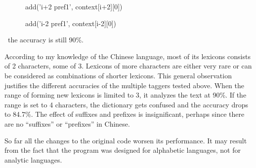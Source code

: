 \documentclass[letterpaper]{article}
\begin{document}
\ \ \ \ \ \ add('i+2 pref1', context[i+2][0])

\ \ \ \ \ \ add('i-2 pref1', context[i-2][0])

\ the accuracy is still 90\%.\ \ \ \ 


\bigskip

According to my knowledge of the Chinese language, most of its lexicons consists of 2 characters, some of 3. Lexicons of
more characters are either very rare or can be considered as combinations of shorter lexicons. This general observation
justifies the different accuracies of the multiple taggers tested above. When the range of forming new lexicons is
limited to 3, it analyzes the text at 90\%. If the range is set to 4 characters, the dictionary gets confused and the
accuracy drops to 84.7\%. The effect of suffixes and prefixes is insignificant, perhaps since there are no ``suffixes''
or ``prefixes'' in Chinese.


\bigskip

So far all the changes to the original code worsen its performance. It may result from the fact that the program was
designed for alphabetic languages, not for analytic languages.


\bigskip
\end{document}
